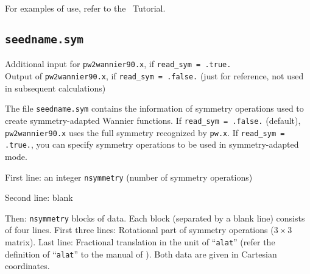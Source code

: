 For examples of use, refer to the \wannier\ Tutorial.


\subsection{{\tt seedname.sym}}

Additional input for {\tt pw2wannier90.x}, if \verb#read_sym = .true.#  \\ 
Output of {\tt pw2wannier90.x}, if \verb#read_sym = .false.# (just for reference, not used in subsequent calculations)

The file \verb#seedname.sym# contains the information of symmetry operations used to create symmetry-adapted Wannier functions.  
If \verb#read_sym = .false.# (default), {\tt pw2wannier90.x} uses the full symmetry recognized by {\tt pw.x}. 
If \verb#read_sym = .true.#, you can specify symmetry operations to be used in symmetry-adapted mode.  


First line: an integer \verb#nsymmetry# (number of symmetry operations)

Second line: blank
 
Then:   \verb#nsymmetry# blocks of data.  
Each block (separated by a blank line) consists of four lines.  
First three lines: Rotational part of symmetry operations ($3\times3$ matrix). 
Last line: Fractional translation in the unit of ``\verb#alat#'' (refer the definition of ``\verb#alat#'' to the manual of \pwscf). 
Both data are given in Cartesian coordinates. 


